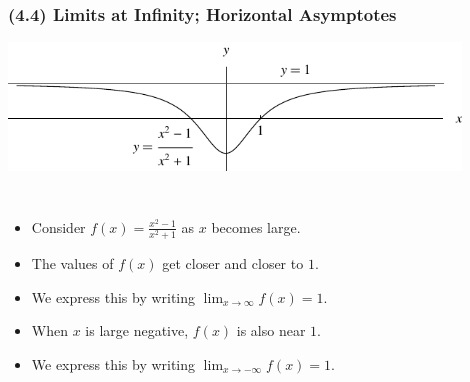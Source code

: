 \begin{frame}
\frametitle{(4.4) Limits at Infinity; Horizontal Asymptotes}
\includegraphics[width=12cm]{curve-sketching/pictures/04-04-intro.pdf}%
\begin{columns}[c]
%
\begin{itemize}
\item  Consider $f(x) = \frac{x^2-1}{x^2+1}$ as $x$ becomes large.
\item<2->  The values of $f(x)$ get closer and closer to $1$.
\item<3->  We express this by writing $\lim_{x\to \infty} f(x) = 1$.
\item<4->  When $x$ is large negative, $f(x)$ is also near $1$.
\item<5->  We express this by writing $\lim_{x\to -\infty} f(x) = 1$.
\end{itemize}
\end{columns}
\end{frame}
